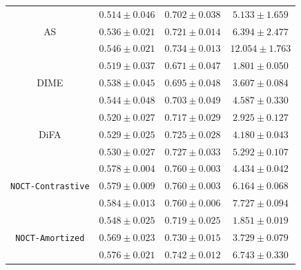 \begin{table}[ht]
\begin{center}
\begin{sc}
{\begin{tabular}{c c c c}
      \multirow{3}{*}{AS}
        & $0.514\pm0.046$ & $0.702\pm0.038$ & $5.133\pm1.659$ \\ 
        & $0.536\pm0.021$ & $0.721\pm0.014$ & $6.394\pm2.477$ \\
        & $0.546\pm0.021$ & $0.734\pm0.013$ & $12.054\pm1.763$ \\
        \hline
      \multirow{3}{*}{DIME}
        & $0.519\pm0.037$ & $0.671\pm0.047$ & $1.801\pm0.050$ \\
        & $0.538\pm0.045$ & $0.695\pm0.048$ & $3.607\pm0.084$ \\
        & $0.544\pm0.048$ & $0.703\pm0.049$ & $4.587\pm0.330$ \\ \hline
      \multirow{3}{*}{DiFA}
        & $0.520\pm0.027$ & $0.717\pm0.029$ & $2.925\pm0.127$ \\ 
        & $0.529\pm0.025$ & $0.725\pm0.028$ & $4.180\pm0.043$ \\
        & $0.530\pm0.027$ & $0.727\pm0.033$ & $5.292\pm0.107$ \\
        \hline

      \multirow{3}{*}{\texttt{NOCT-Contrastive}}
& $0.578\pm0.004$ & $0.760\pm0.003$ & $4.434\pm0.042$ \\ 
& $0.579\pm0.009$ & $0.760\pm0.003$ & $6.164\pm0.068$ \\
& $0.584\pm0.013$ & $0.760\pm0.006$ & $7.727\pm0.094$ \\
\hline

      \multirow{3}{*}{\texttt{NOCT-Amortized}}
        & $0.548\pm0.025$ & $0.719\pm0.025$ & $1.851\pm0.019$ \\
        & $0.569\pm0.023$ & $0.730\pm0.015$ & $3.729\pm0.079$ \\
        & $0.576\pm0.021$ & $0.742\pm0.012$ & $6.743\pm0.330$ \\ \bottomrule
    \end{tabular}
    }
    \end{sc}

\end{center}
\vspace{-0.15in}

\end{table}



